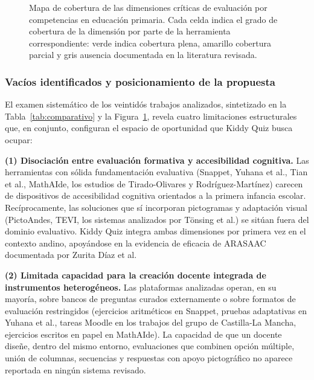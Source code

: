 \begin{figure}[H]
\caption{Mapa de cobertura de las dimensiones críticas de evaluación por competencias en educación primaria. Cada celda indica el grado de cobertura de la dimensión por parte de la herramienta correspondiente: verde indica cobertura plena, amarillo cobertura parcial y gris ausencia documentada en la literatura revisada.}
\label{fig:cobertura}
\end{figure}
\elaboracion

\subsubsection{Vacíos identificados y posicionamiento de la propuesta}

El examen sistemático de los veintidós trabajos analizados, sintetizado en la Tabla~\ref{tab:comparativo} y la Figura~\ref{fig:cobertura}, revela cuatro limitaciones estructurales que, en conjunto, configuran el espacio de oportunidad que Kiddy Quiz busca ocupar:

\textbf{(1) Disociación entre evaluación formativa y accesibilidad cognitiva.} Las herramientas con sólida fundamentación evaluativa (Snappet, Yuhana et al., Tian et al., MathAIde, los estudios de Tirado-Olivares y Rodríguez-Martínez) carecen de dispositivos de accesibilidad cognitiva orientados a la primera infancia escolar. Recíprocamente, las soluciones que sí incorporan pictogramas y adaptación visual (PictoAndes, TEVI, los sistemas analizados por Tönsing et al.) se sitúan fuera del dominio evaluativo. Kiddy Quiz integra ambas dimensiones por primera vez en el contexto andino, apoyándose en la evidencia de eficacia de ARASAAC documentada por Zurita Díaz et al.

\textbf{(2) Limitada capacidad para la creación docente integrada de instrumentos heterogéneos.} Las plataformas analizadas operan, en su mayoría, sobre bancos de preguntas curados externamente o sobre formatos de evaluación restringidos (ejercicios aritméticos en Snappet, pruebas adaptativas en Yuhana et al., tareas Moodle en los trabajos del grupo de Castilla-La Mancha, ejercicios escritos en papel en MathAIde). La capacidad de que un docente diseñe, dentro del mismo entorno, evaluaciones que combinen opción múltiple, unión de columnas, secuencias y respuestas con apoyo pictográfico no aparece reportada en ningún sistema revisado.


